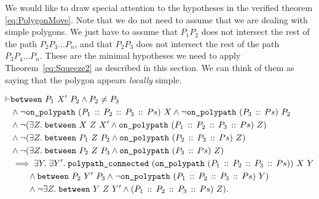 We would like to draw special attention to the hypotheses in the verified theorem \eqref{eq:PolygonMove}. Note that we do not need to assume that we are dealing with simple polygons. We just have to assume that $P_1P_2$ does not intersect the rest of the path $P_2P_3\ldots P_n$, and that $P_2P_3$ does not intersect the rest of the path $P_3P_4\ldots P_n$. These are the minimal hypotheses we need to apply Theorem~\ref{eq:Squeeze2} as described in this section. We can think of them as saying that the polygon appears \emph{locally} simple.

\begin{equation}\label{eq:PolygonMove}
  \begin{split}
\vdash    &\texttt{between}\ P_1\ X'\ P_2 \wedge P_2 \neq P_3\\
    &\wedge \neg\texttt{on\_polypath}\ (P_1\,::\,P_2\,::\,P_3\,::\,Ps)\ X \wedge \neg\texttt{on\_polypath}\ (P_3\,::\,Ps)\ P_2\\
    &\wedge \neg(\exists Z.\; \texttt{between}\ X\ Z\ X' \wedge \texttt{on\_polypath}\ (P_1\,::\,P_2\,::\,P_3\,::\,Ps)\ Z)\\
    &\wedge \neg(\exists Z.\; \texttt{between}\ P_1\ Z\ P_2 \wedge \texttt{on\_polypath}\ (P_2\,::\,P_3\,::\,Ps)\ Z)\\
    &\wedge \neg(\exists Z.\; \texttt{between}\ P_2\ Z\ P_3 \wedge \texttt{on\_polypath}\ (P_3\,::\,Ps)\ Z)\\
    &\implies \exists Y.\;\exists Y'.\; \texttt{polypath\_connected}\ (\texttt{on\_polypath}\ (P_1\,::\,P_2\,::\,P_3\,::\,Ps))\ X\ Y\\
    &\qquad\wedge \texttt{between}\ P_2\ Y'\ P_3\wedge \neg\texttt{on\_polypath}\ (P_1\,::\,P_2\,::\,P_3\,::\,Ps)\ Y)\\
    &\qquad\wedge \neg\exists Z.\; \texttt{between}\ Y\ Z\ Y' \wedge (P_1\,::\,P_2\,::\,P_3\,::\,Ps)\ Z).
  \end{split}
\end{equation}

